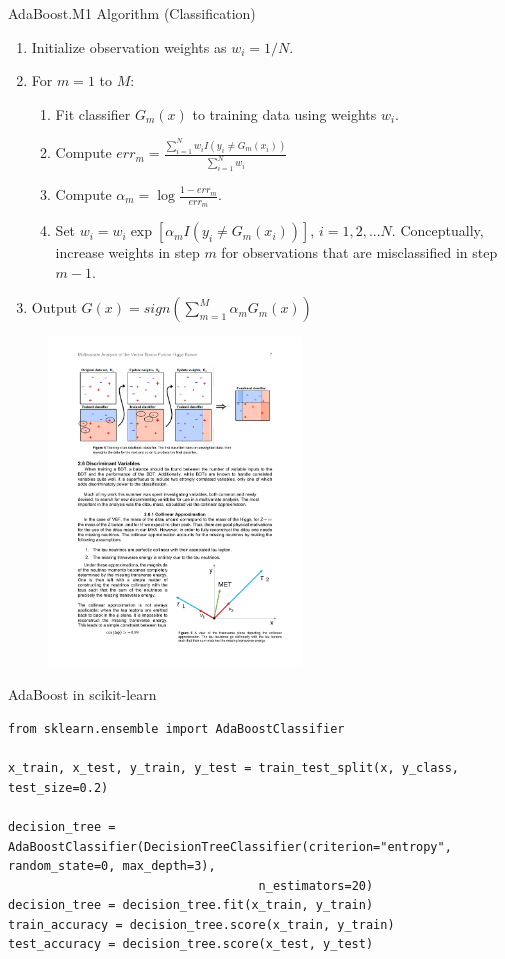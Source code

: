 \documentclass{beamer}
\begin{document}
\begin{frame}{AdaBoost.M1 Algorithm (Classification)}
    \label{frame:adaboost}
    \begin{enumerate}
        \item Initialize observation weights as $w_i = 1/N$.
        \item For $m=1$ to $M$:
        \begin{enumerate}
            \item Fit classifier $G_m(x)$ to training data using weights $w_i$.
            \item Compute $err_m = \frac{\sum_{i=1}^{N} w_i I(y_i \neq G_m(x_i))}{\sum_{i=1}^{N} w_i}$
            \item Compute $\alpha_m = \log{\frac{1-err_m}{err_m}}$.
            \item Set $w_i = w_i\exp[\alpha_mI(y_i \neq G_m(x_i))]$, $i = 1, 2, ...N$. Conceptually, increase weights in step $m$ for observations that are misclassified in step $m-1$.
        \end{enumerate}
        \item Output $G(x) = sign\left( \sum_{m=1}^M \alpha_mG_m(x)\right)$
    \end{enumerate}
    \begin{figure}
        \centering
        \includegraphics[width=0.6\textwidth]{figures/adaboostalgo.pdf}
    \end{figure}
\end{frame}


\begin{frame}[fragile]{AdaBoost in scikit-learn}
\begin{verbatim}
from sklearn.ensemble import AdaBoostClassifier

x_train, x_test, y_train, y_test = train_test_split(x, y_class, test_size=0.2)

decision_tree = AdaBoostClassifier(DecisionTreeClassifier(criterion="entropy", random_state=0, max_depth=3), 
                                   n_estimators=20)
decision_tree = decision_tree.fit(x_train, y_train)
train_accuracy = decision_tree.score(x_train, y_train)
test_accuracy = decision_tree.score(x_test, y_test)
\end{verbatim}
\end{frame}
\end{document}

